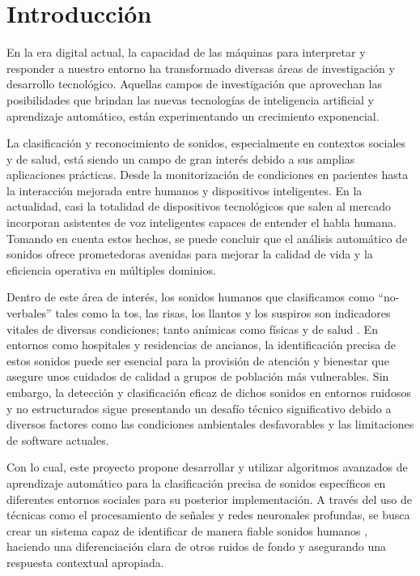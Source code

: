 
\section{Introducción}
En la era digital actual, la capacidad de las máquinas para interpretar y responder a nuestro entorno ha transformado diversas áreas de investigación y desarrollo tecnológico. Aquellas campos de investigación que aprovechan las posibilidades que brindan las nuevas tecnologías de inteligencia artificial y aprendizaje automático, están experimentando un crecimiento exponencial.

 La clasificación y reconocimiento de sonidos, especialmente en contextos sociales y de salud, está siendo un campo de gran interés debido a sus amplias aplicaciones prácticas. Desde la monitorización de condiciones en pacientes hasta la interacción mejorada entre humanos y dispositivos inteligentes. En la actualidad, casi la totalidad de dispositivos tecnológicos que salen al mercado incorporan asistentes de voz inteligentes capaces de entender el habla humana. Tomando en cuenta estos hechos, se puede concluir que  el análisis automático de sonidos ofrece prometedoras avenidas para mejorar la calidad de vida y la eficiencia operativa en múltiples dominios.

Dentro de este área de interés, los sonidos humanos que clasificamos como “no-verbales” tales como la tos, las risas, los llantos y los suspiros son indicadores vitales de diversas condiciones; tanto anímicas como físicas y de salud . En entornos como hospitales y residencias de ancianos, la identificación precisa de estos sonidos puede ser esencial para la provisión de atención y bienestar que asegure unos cuidados de calidad a grupos de población más vulnerables. Sin embargo, la detección y clasificación eficaz de dichos sonidos en entornos ruidosos y no estructurados sigue presentando un desafío técnico significativo debido a diversos factores como las condiciones ambientales desfavorables y las limitaciones de software actuales.

Con lo cual, este proyecto propone desarrollar y utilizar algoritmos avanzados de aprendizaje automático para la clasificación precisa de sonidos específicos en diferentes entornos sociales para su posterior implementación. A través del uso de técnicas como el procesamiento de señales y redes neuronales profundas, se busca crear un sistema capaz de identificar de manera fiable sonidos humanos , haciendo una diferenciación clara de otros ruidos de fondo y asegurando una respuesta contextual apropiada.

